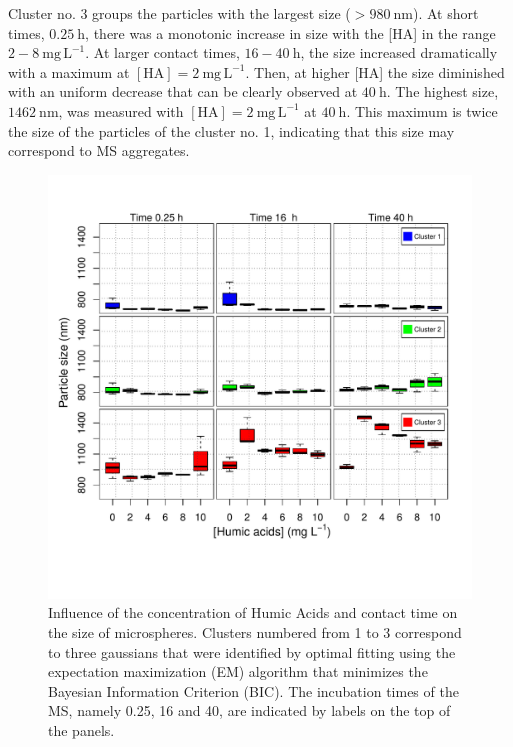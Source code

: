 \documentclass[journal=langd5,manuscript=article]{achemso}
\begin{document}


Cluster no. 3 groups the particles with the largest size ($> 980~\mathrm{nm}$).  At short times, $0.25~\mathrm{h}$, there was a monotonic increase in size with the [HA] in the range $2-8~\mathrm{mg\,L^{-1}}$. At larger contact times, $16-40~\mathrm{h}$, the size increased dramatically with a maximum at $\mathrm{[HA]} = 2~\mathrm{mg\,L^{-1}}$. Then, at higher [HA] the size  diminished with an uniform decrease that can be clearly observed at 
$40~\mathrm{h}$. The highest size, $1462~\mathrm{nm}$, was measured with $\mathrm{[HA]} = 2~\mathrm{mg\,L^{-1}}
$ at  $40~\mathrm{h}$. This maximum is twice the size of the particles of the cluster no. 1, indicating that this size may correspond to MS aggregates. 

 \begin{figure}
  \includegraphics[width=\linewidth]{Figures/Boxplot_MS_HA_CaCl2_sizes.pdf}
  \caption{Influence of the concentration of Humic Acids and contact time on the  size of microspheres.  Clusters numbered from 1 to 3 correspond to three gaussians that were identified by optimal fitting using the expectation maximization (EM) algorithm  that minimizes the Bayesian Information Criterion (BIC). The incubation times of the MS,  namely 0.25, 16 and 40, are indicated by labels on the top of the panels.}
  \label{fgr:boxplot_size}
\end{figure}
\end{document}
